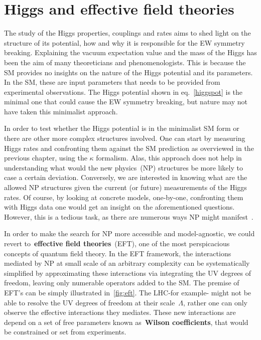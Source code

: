 \chapter{Higgs and effective field theories }\label{chap:HiggsEFT}
\par The study of the Higgs properties, couplings and rates aims to shed light on the structure of its potential, how and why it is responsible for the EW symmetry breaking. Explaining the vacuum expectation value and the mass of the Higgs has been the aim of many theoreticians and phenomenologists. This is because the SM provides no insights on the nature of the Higgs potential and its parameters.  In the SM, these are  input parameters that needs to be provided from experimental observations. The Higgs potential shown in eq.~\eqref{higgspot} is the minimal one that could cause the EW symmetry breaking, but nature may not have taken this minimalist approach. 
\par  In order to test whether the Higgs potential is in the minimalist SM form or there are other more complex structures involved. One can start by measuring Higgs rates and confronting them against the SM prediction as overviewed in the previous chapter, using the $\kappa$ formalism.  Alas, this approach does not help in understanding what would the new physics~(NP) structures be more likely to case a certain deviation. Conversely, we are interested in knowing what are the allowed NP structures given the current (or future) measurements of the Higgs rates.  Of course, by looking at concrete models, one-by-one,  confronting them with Higgs data one would get an insight on the aforementioned questions. However, this is a  tedious task, as there are numerous ways NP might manifest~. 
\par In order to make the search for NP more accessible and model-agnostic, we could revert to~\textbf{effective field theories}~(EFT), one of the most perspicacious concepts of quantum field theory. In the EFT framework, the interactions mediated by  NP at small scale of an arbitrary complexity can be systematically simplified by approximating these interactions via integrating the UV degrees of freedom, leaving only numerable operators added to the SM. The premise of EFT's can be simply illustrated in~\autoref{fig:eft}.  The LHC-for example- might not be able to resolve the UV degrees of freedom at their scale~$\Lambda$, rather one can only observe the effective interactions they mediates. These new interactions are depend on a set of free parameters known as~\textbf{Wilson coefficients}, that would be constrained or set from experiments. 

